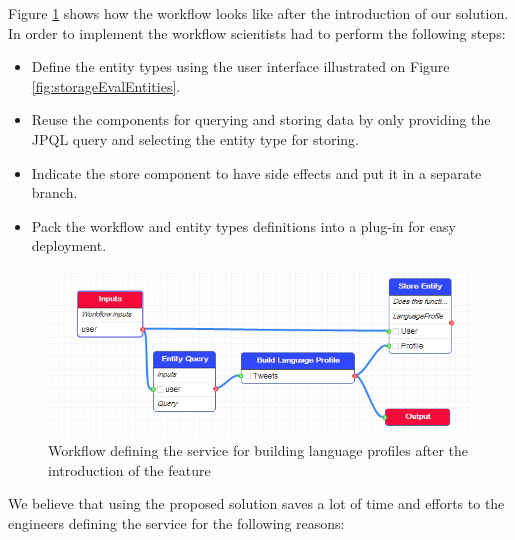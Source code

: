 Figure \ref{fig:storageEvalAfter} shows how the workflow looks like after the introduction of our solution. In order to implement the workflow scientists had to perform the following steps:
\begin{itemize}
	\item Define the entity types using the user interface illustrated on Figure \ref{fig:storageEvalEntities}.
	\item Reuse the components for querying and storing data by only providing the JPQL query and selecting the entity type for storing.
	\item Indicate the store component to have side effects and put it in a separate branch.
	\item Pack the workflow and entity types definitions into a plug-in for easy deployment.
\end{itemize}

\begin{figure}[h!]
  \centering
  	\includegraphics[scale=0.5]{storage/eval/after.png}
  \caption{Workflow defining the service for building language profiles after the introduction of the feature}
  \label{fig:storageEvalAfter}
\end{figure}

We believe that using the proposed solution saves a lot of time and efforts to the engineers defining the service for the following reasons:

